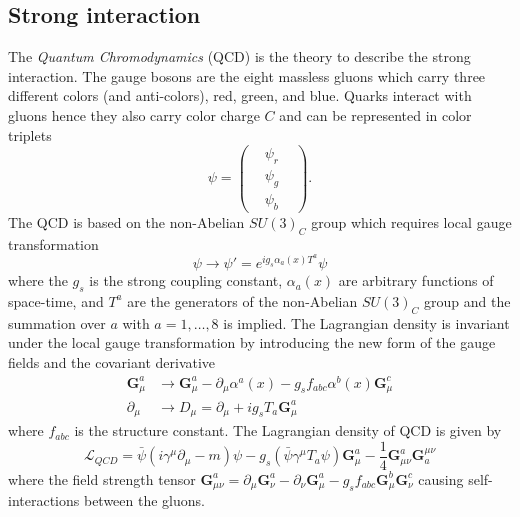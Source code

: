 \subsection{Strong interaction}
\label{subsec:sm_strong_interaction}
The \textit{Quantum Chromodynamics} (QCD) is the theory to describe the strong interaction.
The gauge bosons are the eight massless gluons which carry three different colors (and anti-colors), red, green, and blue.
Quarks interact with gluons hence they also carry color charge $C$ and can be represented in color triplets
%
\begin{equation}
    \psi = 
    \left(
        \begin{matrix}
            & \psi_{r} & \\
            & \psi_{g} & \\
            & \psi_{b} &
        \end{matrix}
    \right).
    \label{eq:sm_quark_triplets}
\end{equation}
%
The QCD is based on the non-Abelian $SU(3)_{C}$ group which requires local gauge transformation
%
\begin{equation}
    \psi \rightarrow \psi' = e^{i g_{s} \alpha_{a}(x) T^{a}}\psi
    \label{eq:sm_qcd_gauge_transformation_1}
\end{equation}
%
where the $g_{s}$ is the strong coupling constant, $\alpha_{a}(x)$ are arbitrary functions of space-time, and $T^{a}$ are the generators of the non-Abelian $SU(3)_{C}$ group and the summation over $a$ with $a = 1, \dots, 8$ is implied.
The Lagrangian density is invariant under the local gauge transformation by introducing the new form of the gauge fields and the covariant derivative
%
\begin{align}
    \bm{G}_{\mu}^{a} & \rightarrow \bm{G}_{\mu}^{a} -  \partial_{\mu} \alpha^{a}(x) - g_{s} f_{abc} \alpha^{b}(x) \bm{G}_{\mu}^{c} \\
    \partial_{\mu} & \rightarrow D_{\mu} = \partial_{\mu} + i g_{s} T_{a} \bm{G}_{\mu}^{a}
    \label{eq:sm_qcd_gauge_transformation_2}
\end{align}
%
where $f_{abc}$ is the structure constant. 
The Lagrangian density of QCD is given by
%
\begin{equation}
    \mathcal{L}_{QCD} = \bar{\psi}(i \gamma^{\mu} \partial_{\mu} - m) \psi - g_{s} ( \bar{\psi} \gamma^{\mu} T_{a} \psi) \bm{G}_{\mu}^{a} - \frac{1}{4} \bm{G}_{\mu\nu}^{a} \bm{G}_{a}^{\mu\nu}
    \label{eq:sm_qcd_lagrangian}
\end{equation}
%
where the field strength tensor $\bm{G}_{\mu\nu}^{a} = \partial_{\mu} \bm{G}_{\nu}^{a} - \partial_{\nu} \bm{G}_{\mu}^{a} - g_{s} f_{abc} \bm{G}_{\mu}^{b} \bm{G}_{\nu}^{c}$ causing self-interactions between the gluons.
